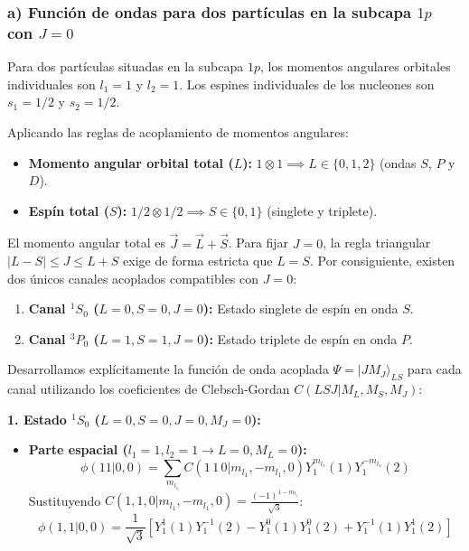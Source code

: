 \begin{problema}
\newpage

\subsubsection*{a) Función de ondas para dos partículas en la subcapa $1p$ con $J = 0$}

Para dos partículas situadas en la subcapa $1p$, los momentos angulares orbitales individuales son $l_1 = 1$ y $l_2 = 1$. Los espines individuales de los nucleones son $s_1 = 1/2$ y $s_2 = 1/2$.

Aplicando las reglas de acoplamiento de momentos angulares:
\begin{itemize}
    \item \textbf{Momento angular orbital total ($L$):} $1 \otimes 1 \implies L \in \{0, 1, 2\}$ (ondas $S$, $P$ y $D$).
    \item \textbf{Espín total ($S$):} $1/2 \otimes 1/2 \implies S \in \{0, 1\}$ (singlete y triplete).
\end{itemize}

El momento angular total es $\vec{J} = \vec{L} + \vec{S}$. Para fijar $J = 0$, la regla triangular $|L - S| \le J \le L + S$ exige de forma estricta que $L = S$. Por consiguiente, existen dos únicos canales acoplados compatibles con $J = 0$:
\begin{enumerate}[label=\arabic*)]
    \item \textbf{Canal ${}^1S_0$ ($L = 0, S = 0, J = 0$):} Estado singlete de espín en onda $S$.
    \item \textbf{Canal ${}^3P_0$ ($L = 1, S = 1, J = 0$):} Estado triplete de espín en onda $P$.
\end{enumerate}

Desarrollamos explícitamente la función de onda acoplada $\Psi = |J M_J\rangle_{LS}$ para cada canal utilizando los coeficientes de Clebsch-Gordan $C(L S J | M_L, M_S, M_J)$:

\textbf{1. Estado ${}^1S_0$ ($L=0, S=0, J=0, M_J=0$):}
\begin{itemize}
    \item \textbf{Parte espacial ($l_1=1, l_2=1 \to L=0, M_L=0$):}
    \begin{equation}
    \phi(11|0,0) = \sum_{m_{l_1}} C(1\, 1\, 0 | m_{l_1}, -m_{l_1}, 0) Y_1^{m_{l_1}}(1) Y_1^{-m_{l_1}}(2)
    \end{equation}
    Sustituyendo $C(1, 1, 0 | m_{l_1}, -m_{l_1}, 0) = \frac{(-1)^{1-m_{l_1}}}{\sqrt{3}}$:
    \begin{equation}
    \phi(1,1|0,0) = \frac{1}{\sqrt{3}} \left[ Y_1^1(1) Y_1^{-1}(2) - Y_1^0(1) Y_1^0(2) + Y_1^{-1}(1) Y_1^1(2) \right]
    \end{equation}


\end{itemize}
\end{problema}
